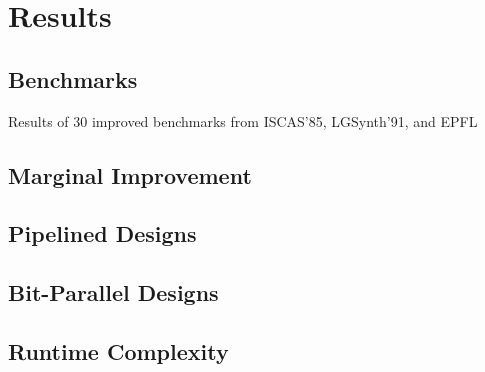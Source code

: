 \section{Results}\label{sec:results}

\subsection{Benchmarks}\label{sec:results:benchmark}
\begin{table}
    \centering
    \caption{Results of 30 improved benchmarks from ISCAS'85, LGSynth'91, and EPFL}\label{tab:results}
\end{table}
\subsection{Marginal Improvement}\label{sec:results:margin}

\subsection{Pipelined Designs}\label{sec:results:retiming}

\subsection{Bit-Parallel Designs}\label{sec:results:scalability}

\subsection{Runtime Complexity}\label{sec:results:complexity}
